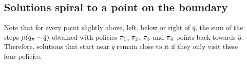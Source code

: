 
% 


\subsection{Solutions spiral to a point on the boundary}






Note that for every point slightly above, left, below or right of $\hat{q}$, the sum of the steps $\mu (q_\pi - \hat{q})$ obtained with policies $\pi_1$, $\pi_2$, $\pi_3$ and $\pi_4$ points back towards $\hat{q}$.
Therefore, solutions that start near $\hat{q}$ remain close to it if they only visit these four policies.

